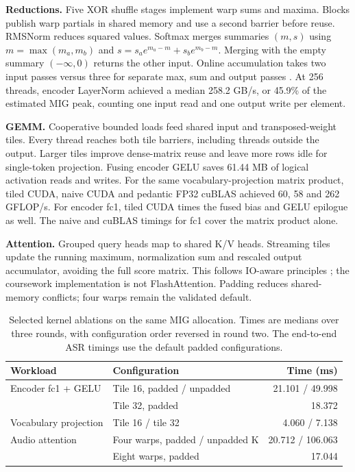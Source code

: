 \documentclass{article}
\begin{document}
\textbf{Reductions.} Five XOR shuffle stages implement warp sums and maxima. Blocks publish warp partials in shared memory and use a second barrier before reuse. RMSNorm reduces squared values. Softmax merges summaries $(m,s)$ using $m=\max(m_a,m_b)$ and $s=s_a e^{m_a-m}+s_b e^{m_b-m}$. Merging with the empty summary $(-\infty,0)$ returns the other input. Online accumulation takes two input passes versus three for separate max, sum and output passes \citep{milakov2018}. At 256 threads, encoder LayerNorm achieved a median 258.2 GB/s, or 45.9\% of the estimated MIG peak, counting one input read and one output write per element.

\textbf{GEMM.} Cooperative bounded loads feed shared input and transposed-weight tiles. Every thread reaches both tile barriers, including threads outside the output. Larger tiles improve dense-matrix reuse and leave more rows idle for single-token projection. Fusing encoder GELU saves 61.44 MB of logical activation reads and writes. For the same vocabulary-projection matrix product, tiled CUDA, naive CUDA and pedantic FP32 cuBLAS achieved 60, 58 and 262 GFLOP/s. For encoder fc1, tiled CUDA times the fused bias and GELU epilogue as well. The naive and cuBLAS timings for fc1 cover the matrix product alone.

\textbf{Attention.} Grouped query heads map to shared K/V heads. Streaming tiles update the running maximum, normalization sum and rescaled output accumulator, avoiding the full score matrix. This follows IO-aware principles \citep{dao2022}; the coursework implementation is not FlashAttention. Padding reduces shared-memory conflicts; four warps remain the validated default.

\begin{table}[h]
\centering
\caption{Selected kernel ablations on the same MIG allocation. Times are medians over three rounds, with configuration order reversed in round two. The end-to-end ASR timings use the default padded configurations.}
\begin{tabular}{llr}
\toprule
Workload & Configuration & Time (ms)\\
\midrule
Encoder fc1 + GELU & Tile 16, padded / unpadded & 21.101 / 49.998\\
 & Tile 32, padded & 18.372\\
Vocabulary projection & Tile 16 / tile 32 & 4.060 / 7.138\\
Audio attention & Four warps, padded / unpadded K & 20.712 / 106.063\\
 & Eight warps, padded & 17.044\\
\bottomrule
\end{tabular}
\end{table}
\end{document}
